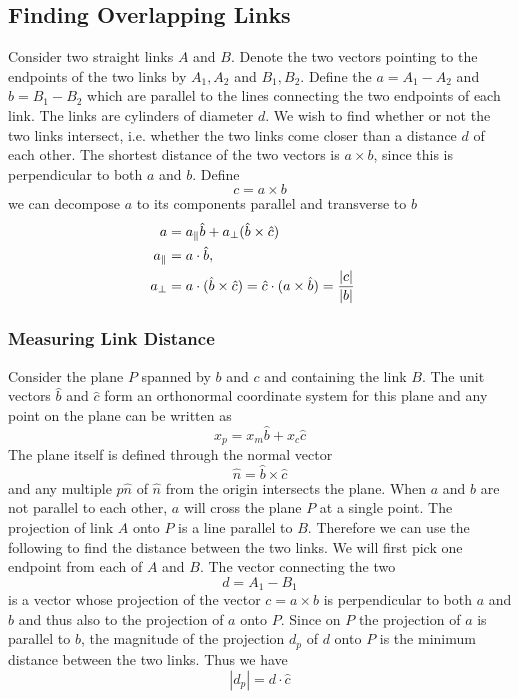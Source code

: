 \documentclass[linenumbers,endfloats,nofootinbib,preprint,floatfix,titlepage,superscriptaddress]{revtex4-1} %
\begin{document}
\subsection{Finding Overlapping Links}
Consider two straight links $A$ and $B$. Denote the two vectors pointing to the endpoints of the two links by $A_1,A_2$ and $B_1,B_2$. Define the $a= A_1 - A_2$ and $ b= B_1 -B_2$ which are parallel to the lines connecting the two endpoints of each link. The links are cylinders of diameter $d$. We wish to find whether or not the two links intersect, i.e. whether the two links come closer than a distance $d$ of each other. The shortest distance of the two vectors is $a \times b$, since this is perpendicular to both $a$ and $b$. Define
\[c = a\times b\]
we can decompose $ a$ to its components parallel and transverse to $b$ 
\begin{align}
a &= a_\parallel \hat{b}+ a_\perp (\hat{b}\times \hat{c})\cr
a_\parallel &= a\cdot \hat{b}, \cr
a_\perp &= a \cdot (\hat{b}\times \hat{c}) = \hat{c} \cdot (a\times \hat{b})= {|c|\over |b|}
\end{align}

\subsubsection{Measuring Link Distance}
Consider the plane $P$ spanned by $b$ and $c$ and containing the link $B$. The unit vectors $\hat{b}$ and $\hat{c}$ form an orthonormal coordinate system for this plane and any point on the plane can be written as
\[x_p = x_m \hat{b}+ x_c\hat{c}\]
The plane itself is defined through the normal vector 
\[\hat{n}= \hat{b}\times\hat{c}\]
and any multiple $p\hat{n}$ of $\hat{n}$ from the origin intersects the plane.
When $ a$ and $b$ are not parallel to each other, $a$ will cross the plane $P$ at a single point. The projection of link $A$ onto $P$ is a line parallel to $B$. Therefore we can use the following to find the distance between the two links. We will first pick one endpoint from each of $A$ and $B$. The vector connecting the two
\[d = A_1-B_1\]
is a vector whose projection of the vector $c = a\times b$ is perpendicular to both $a$ and $b$ and thus also to the projection of $a$ onto $P$. Since on $P$ the projection of $a$ is parallel to $b$, the magnitude of the projection $d_p$ of $d$ onto $P$ is the minimum distance between the two links. Thus we have
\[|d_p| = d \cdot \hat{c}\]
\end{document}
